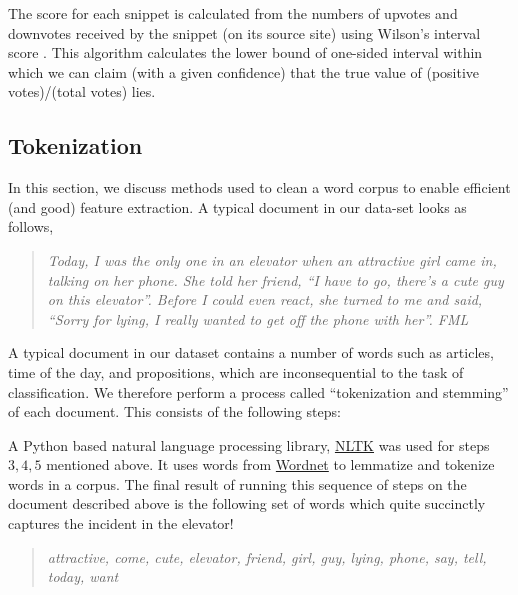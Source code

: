 \documentclass[11pt, letterpaper, conference, final, twocolumn]{ieeeconf}
\begin{document}
The score for each snippet is calculated from the numbers of upvotes and
downvotes received by the snippet (on its source site) using Wilson's interval
score \cite{miller_interval}.  This algorithm calculates the lower bound of
one-sided interval within which we can claim (with a given confidence) that the
true value of (positive votes)/(total votes) lies. 

\subsection{Tokenization}
\label{ssec:tokenization}

In this section, we discuss methods used to clean a word corpus to enable efficient (and good) feature extraction. A typical document in our data-set looks as follows,
\begin{quote}
\small \emph{Today, I was the only one in an elevator when an attractive girl came in, talking on her phone.  She told her friend, ``I have to go, there's a cute guy on this elevator''.  Before I could even react, she turned to me and said, ``Sorry for lying, I really wanted to get off the phone with her''. FML}
\end{quote}
A typical document in our dataset contains a number of words such as articles, time of the day, and propositions, which are inconsequential to the task of classification. We therefore perform a process called ``tokenization and stemming'' of each document. This consists of the following steps:

A Python based natural language processing library, \href{http://www.nltk.org}{NLTK} was used for steps $3,4,5$ mentioned above. It uses words from \href{http://wordnet.princeton.edu}{Wordnet} to lemmatize and tokenize words in a corpus. The final result of running this sequence of steps on the document described above is the following set of words which quite succinctly captures the incident in the elevator!
\begin{quote}
\emph{attractive, come, cute, elevator, friend, girl, guy, lying, phone, say, tell, today, want}
\end{quote}
\end{document}
